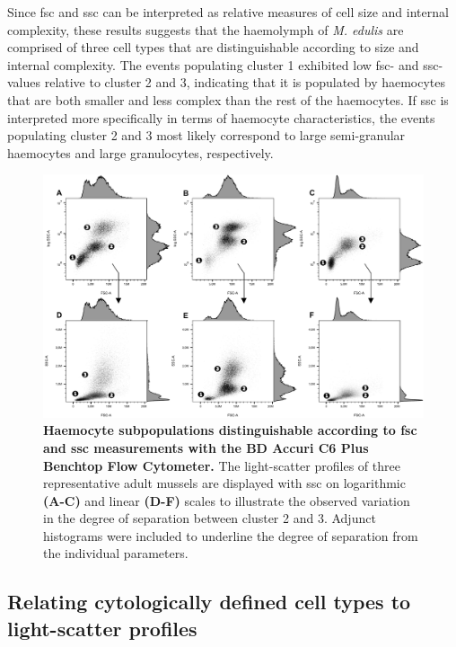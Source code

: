 Since \acrshort{fsc} and \acrshort{ssc} can be interpreted as relative measures of cell size and internal complexity, these results suggests that the haemolymph of \emph{M. edulis} are comprised of three cell types that are distinguishable according to size and internal complexity. The events populating cluster 1 exhibited low \acrshort{fsc}- and \acrshort{ssc}-values relative to cluster 2 and 3, indicating that it is populated by haemocytes that are both smaller and less complex than the rest of the haemocytes. If \acrshort{ssc} is interpreted more specifically in terms of haemocyte characteristics, the events populating cluster 2 and 3 most likely correspond to large semi-granular haemocytes and large granulocytes, respectively.

\begin{figure}[ht!]
    \centering
    \includegraphics[width=1.0\textwidth]{figures/Gating strategy/30k scatter profiles musc.pdf}
    \caption{\textbf{Haemocyte subpopulations distinguishable according to \acrshort{fsc} and \acrshort{ssc} measurements with the BD Accuri C6 Plus Benchtop Flow Cytometer.} The light-scatter profiles of three representative adult mussels are displayed with \acrshort{ssc} on logarithmic \textbf{(A-C)} and linear \textbf{(D-F)} scales to illustrate the observed variation in the degree of separation between cluster 2 and 3. Adjunct histograms were included to underline the degree of separation from the individual parameters.}
    \label{fig:fsc_vs_ssc}
\end{figure}

\subsection{Relating cytologically defined cell types to light-scatter profiles}
\label{subsection:evidence}
